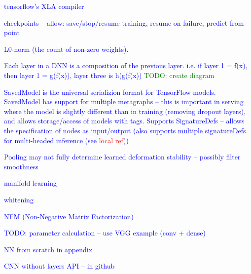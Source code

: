 

\textcolor{blue}{tensorflow's XLA compiler}

\textcolor{blue}{checkpoints -- allow: save/stop/resume training, resume on failure, predict from point}







\textcolor{blue}{L0-norm (the count of non-zero weights).}




\textcolor{blue}{Each layer in a DNN is a composition of the previous layer. i.e. if layer 1 = f(x), then layer 1 = g(f(x)), layer three is h(g(f(x)) \textcolor{green}{TODO: create diagram}}



\textcolor{blue}{SavedModel is the universal serializion format for TensorFlow models. SavedModel has support for multiple metagraphs -- this is important in serving where the model is slightly different than in training (removing dropout layers), and allows storage/access of models with tags. Supports SignatureDefs -- allows the specification of nodes as input/output (also supports multiple signatureDefs for multi-headed inference (see \textcolor{red}{local ref}))}




\textcolor{blue}{Pooling may not fully determine learned deformation stability -- possibly filter smoothness\cite{ruderman2018learned}}

\textcolor{blue}{manifold learning}

\textcolor{blue}{whitening}

\textcolor{blue}{NFM (Non-Negative Matrix Factorization)}

\textcolor{blue}{TODO: parameter calculation -- use VGG example (conv + dense)}

\textcolor{blue}{NN from scratch in appendix}

\textcolor{blue}{CNN without layers API -- in github}